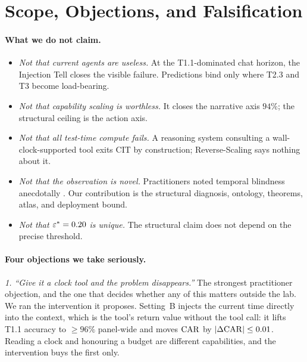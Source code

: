 
\section{Scope, Objections, and Falsification}
\label{sec:limitations}

\paragraph{What we do not claim.}
\begin{itemize}[leftmargin=1.4em, itemsep=1pt]
\item \emph{Not that current agents are useless.} At the T1.1-dominated chat horizon, the Injection Tell closes the visible failure. Predictions bind only where T2.3 and T3 become load-bearing.
\item \emph{Not that capability scaling is worthless.} It closes the narrative axis $94\%$; the structural ceiling is the action axis.
\item \emph{Not that all test-time compute fails.} A reasoning system consulting a wall-clock-supported tool exits CIT by construction; Reverse-Scaling says nothing about it.
\item \emph{Not that the observation is novel.} Practitioners noted temporal blindness anecdotally \citep{cheng2025temporallyblind}. Our contribution is the structural diagnosis, ontology, theorems, atlas, and deployment bound.
\item \emph{Not that $\varepsilon^{*} = 0.20$ is unique.} The structural claim does not depend on the precise threshold.
\end{itemize}

\paragraph{Four objections we take seriously.}

\emph{1. ``Give it a clock tool and the problem disappears.''} The strongest
practitioner objection, and the one that decides whether any of this matters
outside the lab. We ran the intervention it proposes. Setting~B injects the
current time directly into the context, which is the tool's return value
without the tool call: it lifts T1.1 accuracy to $\geq 96\%$ panel-wide and
moves $\mathrm{CAR}$ by $|\Delta\mathrm{CAR}| \leq 0.01$. Reading a clock and honouring a
budget are different capabilities, and the intervention buys the first only.


